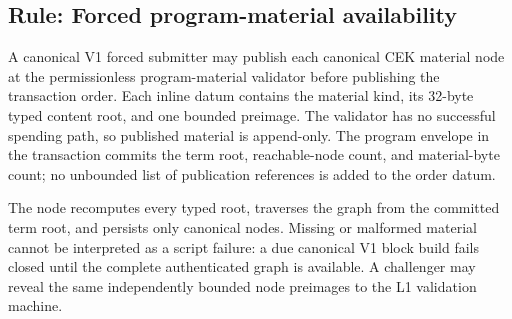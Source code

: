 \documentclass[../midgard.tex]{subfiles}
\begin{document}
\subsection{Rule: Forced program-material availability}

A canonical V1 forced submitter may publish each canonical CEK material node at
the permissionless program-material validator before publishing the
transaction order. Each inline datum contains the material kind, its
32-byte typed content root, and one bounded preimage. The validator has no
successful spending path, so published material is append-only. The program
envelope in the transaction commits the term root, reachable-node count, and
material-byte count; no unbounded list of publication references is added to
the order datum.

The node recomputes every typed root, traverses the graph from the committed
term root, and persists only canonical nodes. Missing or malformed material
cannot be interpreted as a script failure: a due canonical V1 block build fails
closed until the complete authenticated graph is available. A challenger may
reveal the same independently bounded node preimages to the L1 validation
machine.
\end{document}
